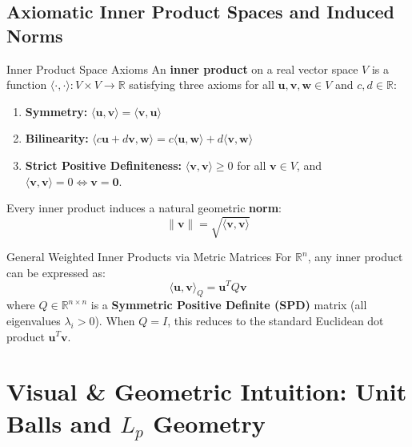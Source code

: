 \subsection{Axiomatic Inner Product Spaces and Induced Norms}

\begin{definitionbox}{Inner Product Space Axioms}
An \textbf{inner product} on a real vector space $V$ is a function $\langle \cdot, \cdot \rangle : V \times V \to \mathbb{R}$ satisfying three axioms for all $\mathbf{u}, \mathbf{v}, \mathbf{w} \in V$ and $c, d \in \mathbb{R}$:
\begin{enumerate}
    \item \textbf{Symmetry:} $\langle \mathbf{u}, \mathbf{v} \rangle = \langle \mathbf{v}, \mathbf{u} \rangle$
    \item \textbf{Bilinearity:} $\langle c\mathbf{u} + d\mathbf{v}, \mathbf{w} \rangle = c\langle \mathbf{u}, \mathbf{w} \rangle + d\langle \mathbf{v}, \mathbf{w} \rangle$
    \item \textbf{Strict Positive Definiteness:} $\langle \mathbf{v}, \mathbf{v} \rangle \ge 0$ for all $\mathbf{v} \in V$, and $\langle \mathbf{v}, \mathbf{v} \rangle = 0 \iff \mathbf{v} = \mathbf{0}$.
\end{enumerate}
Every inner product induces a natural geometric \textbf{norm}:
\begin{equation}
\|\mathbf{v}\| = \sqrt{\langle \mathbf{v}, \mathbf{v} \rangle}
\end{equation}
\end{definitionbox}

\begin{definitionbox}{General Weighted Inner Products via Metric Matrices}
For $\mathbb{R}^n$, any inner product can be expressed as:
\begin{equation}
\langle \mathbf{u}, \mathbf{v} \rangle_Q = \mathbf{u}^T Q \mathbf{v}
\end{equation}
where $Q \in \mathbb{R}^{n \times n}$ is a \textbf{Symmetric Positive Definite (SPD)} matrix (all eigenvalues $\lambda_i > 0$).
When $Q = I$, this reduces to the standard Euclidean dot product $\mathbf{u}^T \mathbf{v}$.
\end{definitionbox}

\section{Visual \& Geometric Intuition: Unit Balls and $L_p$ Geometry}

